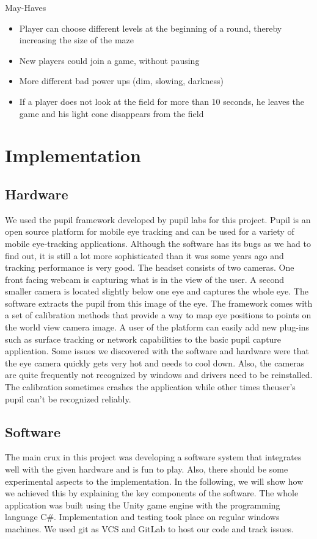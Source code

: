 \documentclass{sigchi}
\begin{document}
	May-Haves
	\begin{itemize}
		\item Player can choose different levels at the beginning of a round, thereby increasing the size of the maze
		\item New players could join a game, without pausing 
		\item More different bad power ups (dim, slowing, darkness)
		\item If a player does not look at the field for more than 10 seconds, he leaves the game and his light cone disappears from the field
		
	\end{itemize}

\section{Implementation}
\subsection{Hardware}
We used the pupil framework developed by pupil labs \cite{kassner2014pupil} for this project. Pupil is an open source platform for mobile eye tracking and can be used for a variety of mobile eye-tracking applications. Although the software has its bugs as we had to find out, it is still a lot more sophisticated than it was some years ago and tracking performance is very good. The headset consists of two cameras. One front facing webcam is capturing what is in the view of the user. A second smaller camera is located slightly below one eye and captures the whole eye. The software extracts the pupil from this image of the eye. The framework comes with a set of calibration methods that provide a way to map eye positions to points on the world view camera image. A user of the platform can easily add new plug-ins such as surface tracking or network capabilities to the basic pupil capture application. Some issues we discovered with the software and hardware were that the eye camera quickly gets very hot and needs to cool down. Also, the cameras are quite frequently not recognized by windows and drivers need to be reinstalled. The calibration sometimes crashes the application while other times theuser's pupil can't be recognized reliably.

\subsection{Software}
The main crux in this project was developing a software system that integrates well with the given hardware and is fun to play. Also, there should be some experimental aspects to the implementation. In the following, we will show how we achieved this by explaining the key components of the software. The whole application was built using the Unity game engine with the programming language C\#. Implementation and testing took place on regular windows machines. We used git as VCS and GitLab to host our code and track issues.
\end{document}
